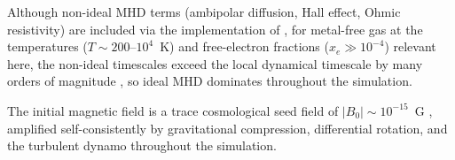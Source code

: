 


Although non-ideal MHD terms (ambipolar diffusion, Hall effect,
Ohmic resistivity) are included via the implementation of
\citet{Hopkins_2017}, for metal-free gas at the temperatures
($T \sim 200$--$10^{4}$~K) and free-electron fractions
($x_e \gg 10^{-4}$) relevant here, the non-ideal timescales
exceed the local dynamical timescale by many orders of magnitude
\citep{meziani26}, so ideal MHD dominates throughout the
simulation.



The initial magnetic field is a trace cosmological seed field of
$|B_0| \sim 10^{-15}$~G ,
amplified self-consistently by gravitational compression,
differential rotation, and the turbulent dynamo throughout the
simulation.



